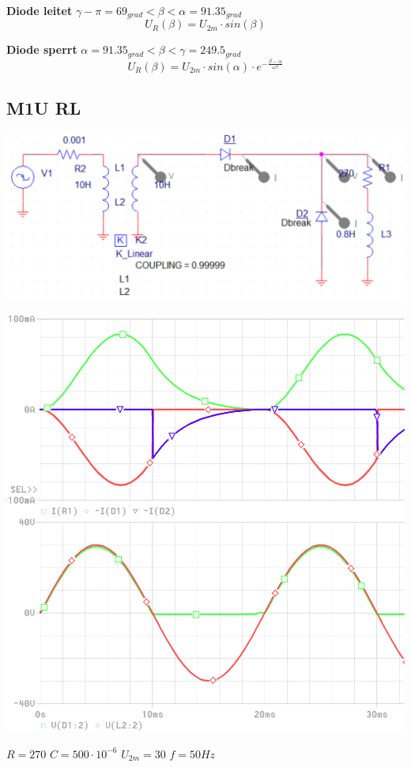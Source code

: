\textbf{Diode leitet} $ \gamma - \pi = 69_{grad} < \beta < \alpha = 91.35_{grad} $\newline
\[  U_R(\beta) = U_{2m} \cdot sin(\beta)\]

\textbf{Diode sperrt} $ \alpha = 91.35_{grad}< \beta < \gamma = 249.5_{grad}  $\newline
\[  U_R(\beta)  =  U_{2m} \cdot sin(\alpha) \cdot e^{-\frac{\beta - \alpha}{\omega \tau}}\]

\clearpage
\subsection{M1U RL}
\begin{minipage}{0.4\linewidth}
    \includegraphics[width=\linewidth]{images/Rechnungsbsp/M1URL}
\end{minipage}
\begin{minipage}{0.2\linewidth}
    \includegraphics[width=\linewidth]{images/Rechnungsbsp/M1URLKL}
\end{minipage}
\begin{minipage}{5cm}
    $ R = 270 $ \newline
    $ C = 500 \cdot 10^{-6} $\newline
    $ U_{2m} = 30 $ \newline
    $ f = 50 Hz $   
\end{minipage}

